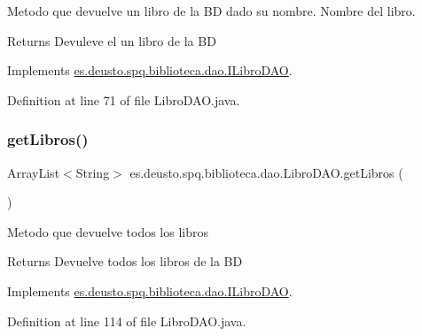 Metodo que devuelve un libro de la BD dado su nombre.  Nombre del libro. \begin{DoxyReturn}{Returns}
Devuleve el un libro de la BD 
\end{DoxyReturn}


Implements \mbox{\hyperlink{interfacees_1_1deusto_1_1spq_1_1biblioteca_1_1dao_1_1_i_libro_d_a_o_a1406f445c6462b6ef7a6d53422650f20}{es.\+deusto.\+spq.\+biblioteca.\+dao.\+I\+Libro\+D\+AO}}.



Definition at line 71 of file Libro\+D\+A\+O.\+java.

\mbox{\label{classes_1_1deusto_1_1spq_1_1biblioteca_1_1dao_1_1_libro_d_a_o_a4af7e01dd7de88e84de3ce7084fcb37a}} 
\subsubsection{\texorpdfstring{get\+Libros()}{getLibros()}}
{\footnotesize\ttfamily Array\+List$<$String$>$ es.\+deusto.\+spq.\+biblioteca.\+dao.\+Libro\+D\+A\+O.\+get\+Libros (\begin{DoxyParamCaption}{ }\end{DoxyParamCaption})}

Metodo que devuelve todos los libros \begin{DoxyReturn}{Returns}
Devuelve todos los libros de la BD 
\end{DoxyReturn}


Implements \mbox{\hyperlink{interfacees_1_1deusto_1_1spq_1_1biblioteca_1_1dao_1_1_i_libro_d_a_o_ad8d7e48cb052174072938ca00ace7fea}{es.\+deusto.\+spq.\+biblioteca.\+dao.\+I\+Libro\+D\+AO}}.



Definition at line 114 of file Libro\+D\+A\+O.\+java.

\mbox{\label{classes_1_1deusto_1_1spq_1_1biblioteca_1_1dao_1_1_libro_d_a_o_a8138eaa485efda1fa97a158f460301dd}} 
